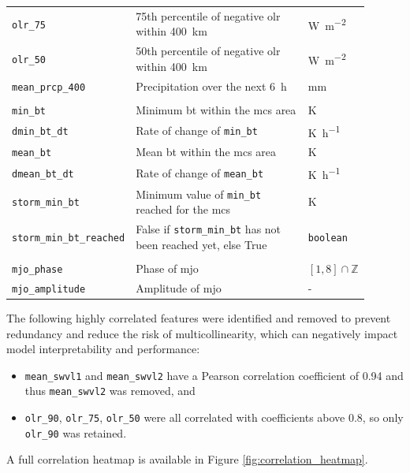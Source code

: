 {\begin{longtable}{>{\raggedright\arraybackslash}p{0.25\linewidth} p{0.50\linewidth} >{\raggedright\arraybackslash}p{0.15\linewidth}}
    \texttt{olr\_75} & 75th percentile of negative \acrshort{olr} within \SI{400}{\km} & \unit{\watt\per\square\meter} \\
    \texttt{olr\_50} & 50th percentile of negative \acrshort{olr} within \SI{400}{\km} & \unit{\watt\per\square\meter} \\
    \texttt{mean\_prcp\_400} & Precipitation over the next \SI{6}{\hour} & \unit{\milli\meter} \\
    \midrule
    \multicolumn{3}{c}{\textit{Storm intensity features}} \\
    \midrule
    \texttt{min\_bt} & Minimum \acrfull{bt} within the \acrshort{mcs} area & \unit{\kelvin} \\
    \texttt{dmin\_bt\_dt} & Rate of change of \texttt{min\_bt} & \unit{\kelvin\per\hour} \\
    \texttt{mean\_bt} & Mean \acrshort{bt} within the \acrshort{mcs} area & \unit{\kelvin} \\
    \texttt{dmean\_bt\_dt} & Rate of change of \texttt{mean\_bt} & \unit{\kelvin\per\hour} \\
    \texttt{storm\_min\_bt} & Minimum value of \texttt{min\_bt} reached for the \acrshort{mcs} & \unit{\kelvin} \\
    \texttt{storm\_min\_bt\_reached} & False if \texttt{storm\_min\_bt} has not been reached yet, else True & \texttt{boolean} \\
    \midrule
    \multicolumn{3}{c}{\textit{Other features}} \\
    \midrule
    \texttt{mjo\_phase} & Phase of \acrfull{mjo} & $[1, 8] \cap \mathbb{Z}$ \\
    \texttt{mjo\_amplitude} & Amplitude of \acrshort{mjo} & - \\
\end{longtable}
}

The following highly correlated features were identified and removed to prevent redundancy and reduce the risk of multicollinearity, which can negatively impact model interpretability and performance: 
\begin{itemize}
    \item \texttt{mean\_swvl1} and \texttt{mean\_swvl2} have a Pearson correlation coefficient of 0.94 and thus \texttt{mean\_swvl2} was removed, and
    \item \texttt{olr\_90}, \texttt{olr\_75}, \texttt{olr\_50} were all correlated with coefficients above 0.8, so only \texttt{olr\_90} was retained.
\end{itemize}
A full correlation heatmap is available in Figure \ref{fig:correlation_heatmap}. 

